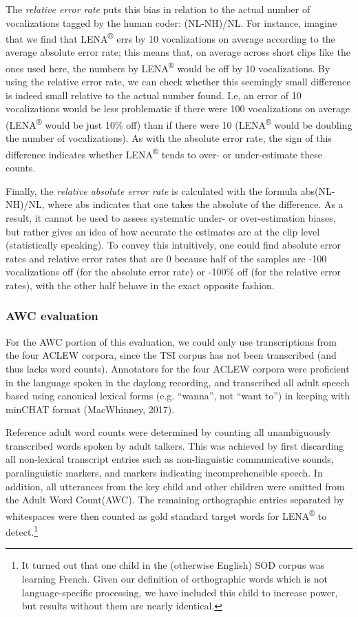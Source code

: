 \documentclass[english,floatsintext,man]{apa6}
\begin{document}
The \emph{relative error rate} puts this bias in relation to the actual
number of vocalizations tagged by the human coder: (NL-NH)/NL. For
instance, imagine that we find that LENA\textsuperscript{®} errs by 10
vocalizations on average according to the average absolute error rate;
this means that, on average across short clips like the ones used here,
the numbers by LENA\textsuperscript{®} would be off by 10 vocalizations.
By using the relative error rate, we can check whether this seemingly
small difference is indeed small relative to the actual number found.
I.e, an error of 10 vocalizations would be less problematic if there
were 100 vocalizations on average (LENA\textsuperscript{®} would be just
10\% off) than if there were 10 (LENA\textsuperscript{®} would be
doubling the number of vocalizations). As with the absolute error rate,
the sign of this difference indicates whether LENA\textsuperscript{®}
tends to over- or under-estimate these counts.

Finally, the \emph{relative absolute error rate} is calculated with the
formula abs(NL-NH)/NL, where abs indicates that one takes the absolute
of the difference. As a result, it cannot be used to assess systematic
under- or over-estimation biases, but rather gives an idea of how
accurate the estimates are at the clip level (statistically speaking).
To convey this intuitively, one could find absolute error rates and
relative error rates that are 0 because half of the samples are -100
vocalizations off (for the absolute error rate) or -100\% off (for the
relative error rates), with the other half behave in the exact opposite
fashion.

\subsubsection{AWC evaluation}\label{awc-evaluation}

For the AWC portion of this evaluation, we could only use transcriptions
from the four ACLEW corpora, since the TSI corpus has not been
transcribed (and thus lacks word counts). Annotators for the four ACLEW
corpora were proficient in the language spoken in the daylong recording,
and transcribed all adult speech based using canonical lexical forms
(e.g. \enquote{wanna}, not \enquote{want to}) in keeping with minCHAT
format (MacWhinney, 2017).

Reference adult word counts were determined by counting all
unambiguously transcribed words spoken by adult talkers. This was
achieved by first discarding all non-lexical transcript entries such as
non-linguistic communicative sounds, paralinguistic markers, and markers
indicating incomprehensible speech. In addition, all utterances from the
key child and other children were omitted from the Adult Word
Count(AWC). The remaining orthographic entries separated by whitespaces
were then counted as gold standard target words for
LENA\textsuperscript{®} to
detect.\footnote{It turned out that one child in the (otherwise English) SOD corpus was learning French. Given our definition of orthographic words which is not language-specific processing, we have included this child to increase power, but results without them are nearly identical.}
\end{document}
